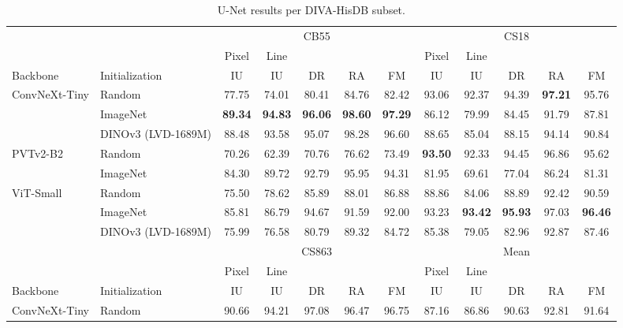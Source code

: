 \begin{table}[htbp]
    \centering
    \scriptsize
    \setlength{\tabcolsep}{1.3pt}
    \renewcommand{\arraystretch}{0.92}
    \caption{U-Net results per DIVA-HisDB subset.}
    \label{tab:rq1-unet-diva-subsets}\label{tab:rq1-unet-diva-average}
    \begin{tabular*}{\textwidth}{@{\extracolsep{\fill}}ll*{10}{c}@{}}
        \toprule
        & & \multicolumn{5}{c}{CB55} & \multicolumn{5}{c}{CS18} \\
        \cmidrule(lr){3-7}\cmidrule(l){8-12}
        & & Pixel & Line & & & & Pixel & Line & & & \\
        Backbone & Initialization & IU & IU & DR & RA & FM & IU & IU & DR & RA & FM \\
        \midrule
        ConvNeXt-Tiny & Random & 77.75 & 74.01 & 80.41 & 84.76 & 82.42 & 93.06 & 92.37 & 94.39 & \textbf{97.21} & 95.76 \\
         & ImageNet & \textbf{89.34} & \textbf{94.83} & \textbf{96.06} & \textbf{98.60} & \textbf{97.29} & 86.12 & 79.99 & 84.45 & 91.79 & 87.81 \\
         & DINOv3 (LVD-1689M) & 88.48 & 93.58 & 95.07 & 98.28 & 96.60 & 88.65 & 85.04 & 88.15 & 94.14 & 90.84 \\
        \addlinespace[1pt]
        PVTv2-B2 & Random & 70.26 & 62.39 & 70.76 & 76.62 & 73.49 & \textbf{93.50} & 92.33 & 94.45 & 96.86 & 95.62 \\
         & ImageNet & 84.30 & 89.72 & 92.79 & 95.95 & 94.31 & 81.95 & 69.61 & 77.04 & 86.24 & 81.31 \\
        \addlinespace[1pt]
        ViT-Small & Random & 75.50 & 78.62 & 85.89 & 88.01 & 86.88 & 88.86 & 84.06 & 88.89 & 92.42 & 90.59 \\
         & ImageNet & 85.81 & 86.79 & 94.67 & 91.59 & 92.00 & 93.23 & \textbf{93.42} & \textbf{95.93} & 97.03 & \textbf{96.46} \\
         & DINOv3 (LVD-1689M) & 75.99 & 76.58 & 80.79 & 89.32 & 84.72 & 85.38 & 79.05 & 82.96 & 92.87 & 87.46 \\
        \midrule
        & & \multicolumn{5}{c}{CS863} & \multicolumn{5}{c}{Mean} \\
        \cmidrule(lr){3-7}\cmidrule(l){8-12}
        & & Pixel & Line & & & & Pixel & Line & & & \\
        Backbone & Initialization & IU & IU & DR & RA & FM & IU & IU & DR & RA & FM \\
        \midrule
        ConvNeXt-Tiny & Random & 90.66 & 94.21 & 97.08 & 96.47 & 96.75 & 87.16 & 86.86 & 90.63 & 92.81 & 91.64 \\

\end{tabular*}
\end{table}
